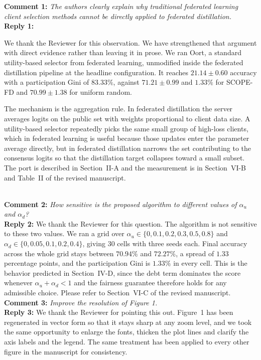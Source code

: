 \documentclass[10pt]{article}
\begin{document}

\noindent
\textbf{Comment 1:} \textit{The authors clearly explain why traditional federated learning client selection methods cannot be directly applied to federated distillation.} \\
\noindent
\textbf{Reply 1:} {We thank the Reviewer for this observation. We have strengthened that argument with direct evidence rather than leaving it in prose. We ran Oort, a standard utility-based selector from federated learning, unmodified inside the federated distillation pipeline at the headline configuration. It reaches $21.14 \pm 0.60$ accuracy with a participation Gini of $83.33\%$, against $71.21 \pm 0.99$ and $1.33\%$ for SCOPE-FD and $70.99 \pm 1.38$ for uniform random.

The mechanism is the aggregation rule. In federated distillation the server averages logits on the public set with weights proportional to client data size. A utility-based selector repeatedly picks the same small group of high-loss clients, which in federated learning is useful because those updates enter the parameter average directly, but in federated distillation narrows the set contributing to the consensus logits so that the distillation target collapses toward a small subset. The port is described in Section~II-A and the measurement is in Section~VI-B and Table~II of the revised manuscript.}\\

\noindent
\textbf{Comment 2:} \textit{How sensitive is the proposed algorithm to different values of $\alpha_u$ and $\alpha_d$?} \\
\noindent
\textbf{Reply 2:} {We thank the Reviewer for this question. The algorithm is not sensitive to these two values. We ran a grid over $\alpha_u \in \{0, 0.1, 0.2, 0.3, 0.5, 0.8\}$ and $\alpha_d \in \{0, 0.05, 0.1, 0.2, 0.4\}$, giving $30$ cells with three seeds each. Final accuracy across the whole grid stays between $70.94\%$ and $72.27\%$, a spread of $1.33$ percentage points, and the participation Gini is $1.33\%$ in every cell. This is the behavior predicted in Section~IV-D, since the debt term dominates the score whenever $\alpha_u + \alpha_d < 1$ and the fairness guarantee therefore holds for any admissible choice. Please refer to Section~VI-C of the revised manuscript.}\\

\noindent
\textbf{Comment 3:} \textit{Improve the resolution of Figure 1.} \\
\noindent
\textbf{Reply 3:} {We thank the Reviewer for pointing this out. Figure~1 has been regenerated in vector form so that it stays sharp at any zoom level, and we took the same opportunity to enlarge the fonts, thicken the plot lines and clarify the axis labels and the legend. The same treatment has been applied to every other figure in the manuscript for consistency.}\\
\end{document}
